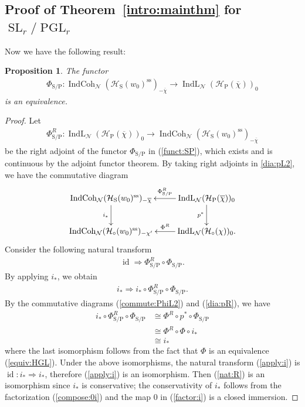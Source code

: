 \documentclass[11pt,oneside,a4paper,mathscr]{amsart}
\newtheorem{prop}[thm]{Proposition}
\theoremstyle{definition}
\newcommand{\cH}{\mathcal{H}}
\newcommand{\id}{\operatorname{id}}
\newcommand{\IndCoh}{\operatorname{IndCoh}}
\newcommand{\IndL}{\operatorname{IndL}}
\newcommand{\SL}{\operatorname{SL}}
\newcommand{\PGL}{\operatorname{PGL}}
\newcommand{\rS}{\mathrm{S}}
\newcommand{\rP}{\mathrm{P}}
\begin{document}
\subsection[Proof of Theorem 1.2 for SLr/PGLr]{Proof of Theorem~\ref{intro:mainthm} for \texorpdfstring{$\SL_r/\PGL_r$}{SLr/PGLr}}
Now we have the following result: 
\begin{prop}\label{thm:SP}
The functor 
\begin{align}\label{funct:SP}
    \Phi_{\rS/\rP} \colon \IndCoh_{\mathcal{N}}(\cH_{\rS}(w_0)^{\mathrm{ss}})_{-\overline{\chi}}
    \to \IndL_{\mathcal{N}}(\cH_{\mathrm{P}}(\overline{\chi}))_0
\end{align} 
is an equivalence. 
\end{prop}
\begin{proof}
Let
\begin{align*}
\Phi_{\rS/\rP}^R \colon
\IndL_{\mathcal{N}}(\cH_{\mathrm{P}}(\overline{\chi}))_0
\to
\IndCoh_{\mathcal{N}}(\cH_{\rS}(w_0)^{\mathrm{ss}})_{-\overline{\chi}}
\end{align*}
be the right adjoint of the functor $\Phi_{\rS/\rP}$ in (\ref{funct:SP}), which exists and is continuous by the adjoint functor theorem. By taking right adjoints in \eqref{dia:pL2}, we have the commutative diagram
\begin{align}\label{dia:pR}
\xymatrix{
\IndCoh_{\mathcal{N}}(\cH_{\rS}(w_0)^{\mathrm{ss}})_{-\overline{\chi}} \ar[d]_-{i_{*}}
&
\IndL_{\mathcal{N}}(\cH_{\mathrm{P}}(\overline{\chi}))_0
\ar[l]_-{\Phi_{\rS/\rP}^R} \ar[d]_-{p^*}
\\
\IndCoh_{\mathcal{N}}(\cH_{\circ}(w_0)^{\mathrm{ss}})_{-\chi'}
&
\IndL_{\mathcal{N}}(\cH_{\circ}(\chi))_0
\ar[l]_-{\Phi^R}.
}
\end{align}
Consider the following natural transform 
\begin{align}\label{nat:R}
    \id \Rightarrow \Phi_{\rS/\rP}^R \circ \Phi_{\rS/\rP}.
\end{align}
By applying $i_{*}$, we obtain 
\begin{align}\label{apply:i}
i_{*} \Rightarrow i_{*}\circ\Phi_{\rS/\rP}^R \circ \Phi_{\rS/\rP}.
\end{align}
By the commutative diagrams (\ref{commute:PhiL2}) and (\ref{dia:pR}), 
we have 
\begin{align*}
    i_{*}\circ \Phi_{\rS/\rP}^R \circ \Phi_{\rS/\rP} &\cong \Phi^R \circ p^* \circ \Phi_{\rS/\rP} \\
    &\cong \Phi^R \circ \Phi \circ i_{*} \\
    &\cong i_{*}
\end{align*}
where the last isomorphism follows from the fact that $\Phi$ is an equivalence (\ref{equiv:HGL}). 
Under the above isomorphisms, the natural transform (\ref{apply:i}) is 
$\id \colon i_{*} \Rightarrow i_{*}$, therefore 
(\ref{apply:i}) is an isomorphism. Then (\ref{nat:R}) is an isomorphism 
since $i_{*}$ is conservative; the conservativity of $i_{*}$ follows 
from the factorization (\ref{compose:0i}) and the map $0$ in (\ref{factor:i}) 
is a closed immersion. 


\end{proof}
\end{document}
